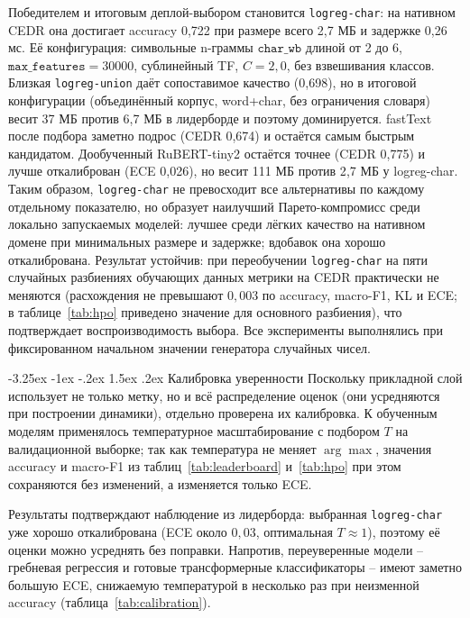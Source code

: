 \documentclass[12pt,a4paper]{report}
\makeatletter
\renewcommand{\subsection}{\@startsection{subsection}{2}{\z@}%
  {-3.25ex \@plus -1ex \@minus -.2ex}%
  {1.5ex \@plus .2ex}%
  {\normalfont\large\bfseries\centering}}
\makeatother
\begin{document}
Победителем и итоговым деплой-выбором становится \texttt{logreg-char}: на нативном CEDR она достигает accuracy 0{,}722 при размере всего 2{,}7 МБ и задержке 0{,}26 мс. Её конфигурация: символьные n-граммы \(\texttt{char\_wb}\) длиной от 2 до 6, \(\texttt{max\_features}=30000\), сублинейный TF, \(C=2{,}0\), без взвешивания классов. Близкая \texttt{logreg-union} даёт сопоставимое качество (0{,}698), но в итоговой конфигурации (объединённый корпус, word+char, без ограничения словаря) весит 37 МБ против 6{,}7 МБ в лидерборде и поэтому доминируется. fastText после подбора заметно подрос (CEDR 0{,}674) и остаётся самым быстрым кандидатом. Дообученный RuBERT-tiny2 остаётся точнее (CEDR 0{,}775) и лучше откалиброван (ECE 0{,}026), но весит 111 МБ против 2{,}7 МБ у logreg-char. Таким образом, \texttt{logreg-char} не превосходит все альтернативы по каждому отдельному показателю, но образует наилучший Парето-компромисс среди локально запускаемых моделей: лучшее среди лёгких качество на нативном домене при минимальных размере и задержке; вдобавок она хорошо откалибрована. Результат устойчив: при переобучении \texttt{logreg-char} на пяти случайных разбиениях обучающих данных метрики на CEDR практически не меняются (расхождения не превышают \(0{,}003\) по accuracy, macro-F1, KL и ECE; в таблице~\ref{tab:hpo} приведено значение для основного разбиения), что подтверждает воспроизводимость выбора. Все эксперименты выполнялись при фиксированном начальном значении генератора случайных чисел.

\subsection{Калибровка уверенности}
\label{subsec:calibration}
Поскольку прикладной слой использует не только метку, но и всё распределение оценок (они усредняются при построении динамики), отдельно проверена их калибровка. К обученным моделям применялось температурное масштабирование с подбором \(T\) на валидационной выборке; так как температура не меняет \(\arg\max\), значения accuracy и macro-F1 из таблиц~\ref{tab:leaderboard} и~\ref{tab:hpo} при этом сохраняются без изменений, а изменяется только ECE.

Результаты подтверждают наблюдение из лидерборда: выбранная \texttt{logreg-char} уже хорошо откалибрована (ECE около \(0{,}03\), оптимальная \(T\approx 1\)), поэтому её оценки можно усреднять без поправки. Напротив, переуверенные модели -- гребневая регрессия и готовые трансформерные классификаторы -- имеют заметно большую ECE, снижаемую температурой в несколько раз при неизменной accuracy (таблица~\ref{tab:calibration}).
\end{document}
